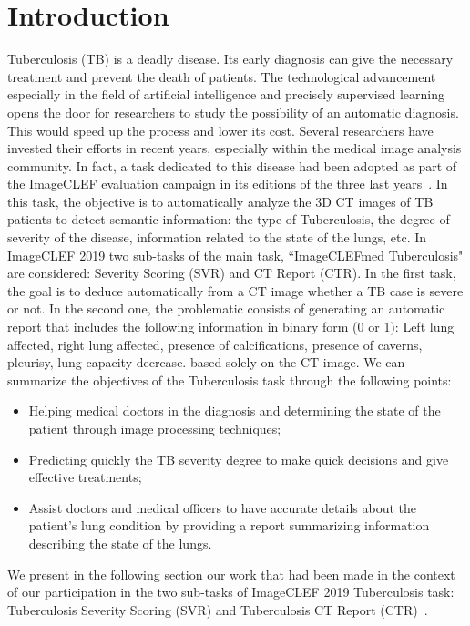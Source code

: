 \documentclass{llncs}
\begin{document}
\section{Introduction}
Tuberculosis (TB) is a deadly disease. Its early diagnosis can give the necessary treatment and prevent the death of patients. The technological advancement especially in the field of artificial intelligence and precisely supervised learning opens the door for researchers to study the possibility of an automatic diagnosis. This would speed up the process and lower its cost. Several researchers have invested their efforts in recent years, especially within the medical image analysis community. In fact, a task dedicated to this disease had been adopted as part of the ImageCLEF evaluation campaign in its editions of the three last years~\cite{ImageCLEFTB2017, ImageCLEFTB2018, ImageCLEFTBoverview2019}. In this task, the objective is to automatically analyze the 3D CT images of TB patients to detect semantic information: the type of Tuberculosis, the degree of severity of the disease, information related to the state of the lungs, etc. In ImageCLEF 2019 two sub-tasks of the main task, ``ImageCLEFmed Tuberculosis" are considered: Severity Scoring (SVR) and CT Report (CTR). In the first task, the goal is to deduce automatically from a CT image whether a TB case is severe or not. In the second one, the problematic consists of generating an automatic report that includes the following information in binary form (0 or 1): Left lung affected, right lung affected, presence of calcifications, presence of caverns, pleurisy, lung capacity decrease. based solely on the CT image.
We can summarize the objectives of the Tuberculosis task through the following points:

\begin {itemize}
\item Helping medical doctors in the diagnosis and determining the state of the patient through image processing techniques;
\item Predicting quickly the TB severity degree to make quick decisions and give effective treatments;
\item Assist doctors and medical officers to have accurate details about the patient's lung condition by providing a report summarizing information describing the state of the lungs.
\end {itemize}

We present in the following section our work that had been made in the context of our participation in the two sub-tasks of ImageCLEF 2019 Tuberculosis task: Tuberculosis Severity Scoring (SVR) and Tuberculosis CT Report (CTR)~\cite{ImageCLEFTBoverview2019}.\\
\end{document}
